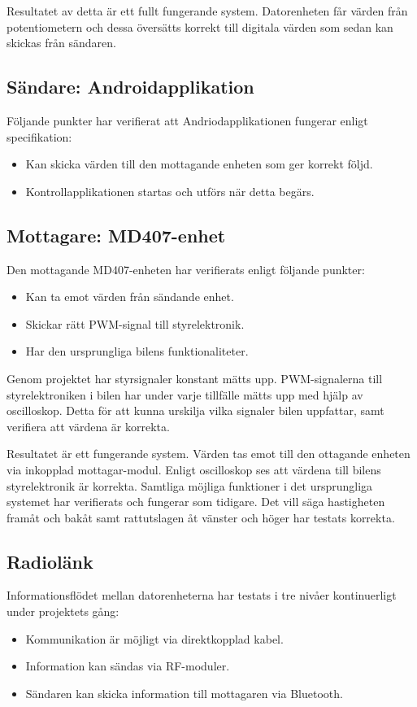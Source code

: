 \documentclass[a4paper]{article}
\begin{document}
\noindent
Resultatet av detta är ett fullt fungerande system. Datorenheten får värden från potentiometern och dessa översätts korrekt till digitala värden som sedan kan skickas från sändaren.


\subsection{Sändare: Androidapplikation}
Följande punkter har verifierat att Andriodapplikationen fungerar enligt specifikation:

\begin{itemize}
\item Kan skicka värden till den mottagande enheten som ger korrekt följd.
\item Kontrollapplikationen startas och utförs när detta begärs.
\end{itemize}




\subsection{Mottagare: MD407-enhet}
Den mottagande MD407-enheten har verifierats enligt följande punkter:

\begin{itemize}
\item Kan ta emot värden från sändande enhet.
\item Skickar rätt PWM-signal till styrelektronik.
\item Har den ursprungliga bilens funktionaliteter.
\end{itemize}

\noindent
Genom projektet har styrsignaler konstant mätts upp. PWM-signalerna till styrelektroniken i bilen har under varje tillfälle mätts upp med hjälp av oscilloskop. Detta för att kunna urskilja vilka signaler bilen uppfattar, samt verifiera att värdena är korrekta.

\vspace{5mm} \noindent
Resultatet är ett fungerande system. Värden tas emot till den ottagande enheten via inkopplad mottagar-modul. Enligt oscilloskop ses att värdena till bilens styrelektronik är korrekta. Samtliga möjliga funktioner i det ursprungliga systemet har verifierats och fungerar som tidigare. Det vill säga hastigheten framåt och bakåt samt rattutslagen åt vänster och höger har testats korrekta.


\subsection{Radiolänk}
Informationsflödet mellan datorenheterna har testats i tre nivåer kontinuerligt under projektets gång:
\begin{itemize}
\item Kommunikation är möjligt via direktkopplad kabel.
\item Information kan sändas via RF-moduler.
\item Sändaren kan skicka information till mottagaren via Bluetooth.
\end{itemize}
\end{document}
